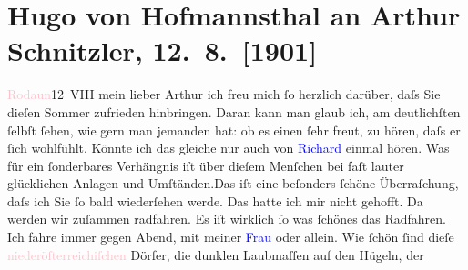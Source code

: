 

               \section[Hugo von Hofmannsthal an Arthur Schnitzler, 12. 8. {[}1901{]}]{ Hugo von Hofmannsthal an Arthur Schnitzler, 12. 8. {[}1901{]}}\nopagebreak{}\rehead{ }\normalsize\beginnumbering{} \toendnotes[C]{\smallbreak\pagebreak[2]} 
\toendnotes[C]{\smallbreak}\pstart
           \raggedleft{}{\pb}\textcolor{pink}{Rodaun}{}\ledrightnote{\textcolor{pink}{Rodaun}}{ }12 VIII\pend
           \pstart{}mein lieber Arthur \pend\pstart
           ich freu mich ſo herzlich darüber, daſs Sie dieſen Sommer zufrieden hinbringen. Daran
               kann man glaub ich, am deutlichſten ſelbſt ſehen, wie gern man jemanden hat: ob es
               einen ſehr freut, zu hören, daſs er ſich wohlfühlt. Könnte ich das gleiche nur auch
               von \textcolor{blue}{Richard}{}\ledrightnote{\textcolor{blue}{Richard Beer-Hofmann}} einmal hören. Was für ein ſonderbares
               Verhängnis iſt über dieſem Menſchen bei faſt lauter glücklichen Anlagen und
                  Umſtänden.\hspace*{1.5em}Das iſt {\pb}eine beſonders ſchöne
               Überraſchung, daſs ich Sie ſo bald wiederſehen werde. Das hatte ich mir nicht
               gehofft.\pend
           \pstart
           Da werden wir zuſammen radfahren. Es iſt wirklich ſo was ſchönes das Radfahren. Ich
               fahre immer gegen Abend, mit meiner \textcolor{blue}{Frau}{} oder allein. Wie ſchön ſind dieſe \textcolor{pink}{niederöſterreichiſchen}{}\ledrightnote{\textcolor{pink}{Niederösterreich}} Dörfer, die dunklen Laubmaſſen auf den Hügeln, der

